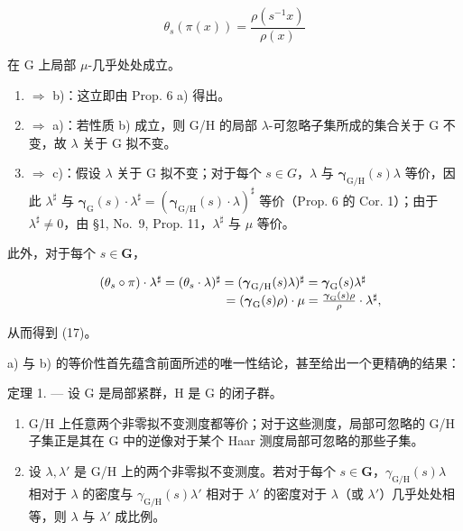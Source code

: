 \[
\theta_ {s} (\pi (x)) = \frac {\rho (s ^ {- 1} x)}{\rho (x)}\tag{17}
\]

在 G 上局部 \(\mu\)-几乎处处成立。

\begin{enumerate}
\def\labelenumi{\alph{enumi})}
\setcounter{enumi}{2}
\item
  \(\Rightarrow\) b)：这立即由 Prop. 6 a) 得出。
\item
  \(\Rightarrow\) a)：若性质 b) 成立，则 G/H 的局部 \(\lambda\)-可忽略子集所成的集合关于 G 不变，故 \(\lambda\) 关于 G 拟不变。
\item
  \(\Rightarrow\) c)：假设 \(\lambda\) 关于 G 拟不变；对于每个 \(s\in G\)，\(\lambda\) 与 \(\pmb{\gamma}_{\mathrm{G / H}}(s)\lambda\) 等价，因此 \(\lambda^{\sharp}\) 与 \(\pmb{\gamma}_{\mathrm{G}}(s)\cdot \lambda^{\sharp} = (\pmb{\gamma}_{\mathrm{G / H}}(s)\cdot \lambda)^{\sharp}\) 等价（Prop. 6 的 Cor. 1）；由于 \(\lambda^{\sharp}\neq 0\)，由 §1, No.~9, Prop. 11，\(\lambda^{\sharp}\) 与 \(\mu\) 等价。
\end{enumerate}

此外，对于每个 \(s \in \mathbf{G}\)，

\[
\begin{array}{r l} & {(\theta_ {s} \circ \pi) \cdot \lambda^ {\sharp} = (\theta_ {s} \cdot \lambda) ^ {\sharp} = (\boldsymbol {\gamma} _ {\mathrm{G/H}} (s) \lambda) ^ {\sharp} = \boldsymbol {\gamma} _ {\mathrm{G}} (s) \lambda^ {\sharp}} \\ & {\qquad \qquad \qquad \qquad \qquad = (\boldsymbol {\gamma} _ {\mathrm{G}} (s) \rho) \cdot \mu = \frac {\boldsymbol {\gamma} _ {\mathrm{G}} (s) \rho}{\rho} \cdot \lambda^ {\sharp},} \end{array}
\]

从而得到 (17)。

a) 与 b) 的等价性首先蕴含前面所述的唯一性结论，甚至给出一个更精确的结果：

定理 1. --- 设 G 是局部紧群，H 是 G 的闭子群。

\begin{enumerate}
\def\labelenumi{\alph{enumi})}
\item
  G/H 上任意两个非零拟不变测度都等价；对于这些测度，局部可忽略的 G/H 子集正是其在 G 中的逆像对于某个 Haar 测度局部可忽略的那些子集。
\item
  设 \(\lambda, \lambda'\) 是 G/H 上的两个非零拟不变测度。若对于每个 \(s \in \mathbf{G}\)，\(\gamma_{\mathrm{G / H}}(s)\lambda\) 相对于 \(\lambda\) 的密度与 \(\gamma_{\mathrm{G / H}}(s)\lambda'\) 相对于 \(\lambda'\) 的密度对于 \(\lambda\)（或 \(\lambda'\)）几乎处处相等，则 \(\lambda\) 与 \(\lambda'\) 成比例。
\end{enumerate}

